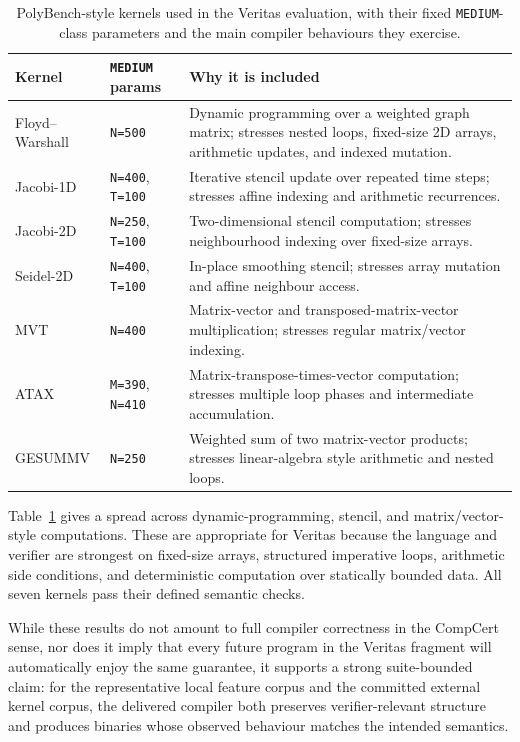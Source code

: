 \begin{table}[h]
  \centering
  \small
  \begin{tabularx}{0.96\textwidth}{>{\raggedright\arraybackslash}p{} >{\raggedright\arraybackslash}p{} >{\raggedright\arraybackslash}X}
    \hline
    \textbf{Kernel} & \textbf{\texttt{MEDIUM} params} & \textbf{Why it is included} \\
    \hline
    Floyd--Warshall & \texttt{N=500} & Dynamic programming over a weighted graph matrix; stresses nested loops, fixed-size 2D arrays, arithmetic updates, and indexed mutation. \\
    Jacobi-1D       & \texttt{N=400}, \texttt{T=100} & Iterative stencil update over repeated time steps; stresses affine indexing and arithmetic recurrences. \\
    Jacobi-2D       & \texttt{N=250}, \texttt{T=100} & Two-dimensional stencil computation; stresses neighbourhood indexing over fixed-size arrays. \\
    Seidel-2D       & \texttt{N=400}, \texttt{T=100} & In-place smoothing stencil; stresses array mutation and affine neighbour access. \\
    MVT             & \texttt{N=400} & Matrix-vector and transposed-matrix-vector multiplication; stresses regular matrix/vector indexing. \\
    ATAX            & \texttt{M=390}, \texttt{N=410} & Matrix-transpose-times-vector computation; stresses multiple loop phases and intermediate accumulation. \\
    GESUMMV         & \texttt{N=250} & Weighted sum of two matrix-vector products; stresses linear-algebra style arithmetic and nested loops. \\
    \hline
  \end{tabularx}
  \caption{PolyBench-style kernels used in the Veritas evaluation, with their
    fixed \texttt{MEDIUM}-class parameters and the main compiler behaviours
    they exercise.}
  \label{tab:polybench-kernels}
\end{table}

Table~\ref{tab:polybench-kernels} gives a spread across dynamic-programming, stencil, and matrix/vector-style computations. These are appropriate for Veritas because the language and verifier are strongest on fixed-size arrays, structured imperative loops, arithmetic side conditions, and deterministic computation over statically bounded data. All seven kernels pass their defined semantic checks.

While these results do not amount to full compiler correctness in the CompCert sense, nor does it imply that every future program in the Veritas fragment will automatically enjoy the same guarantee, it supports a strong suite-bounded claim: for the representative local feature corpus and the committed external kernel corpus, the delivered compiler both preserves verifier-relevant structure and produces binaries whose observed behaviour matches the intended semantics.

